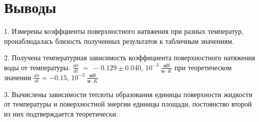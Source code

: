 \documentclass[a4paper,12pt]{article}
\begin{document}
\section{Выводы}
\hspace{5mm}
1. Измерены коэффциенты поверхностного натяжения при разных температур, пронаблюдалась близость полученных результатов к табличным значениям.

2. Получена температурная зависимость коэффициента поверхностного натяжения воды от температуры. $\frac{d\sigma}{dt} \;=\; -0.129 \pm 0.040$, $10^{-3}\; \frac{\text{мН}}{\text{м} \cdot K}$ при теоретическом значении $\frac{d\sigma}{dt} = -0.15$, $10^{-3}\; \frac{\text{мН}}{\text{м} \cdot K}$

3. Вычислены зависимости теплоты образования единицы поверхности жидкости от температуры и поверхностной энергии единицы площади, постоянство второй из них подтверждается теоретически.
\end{document}
